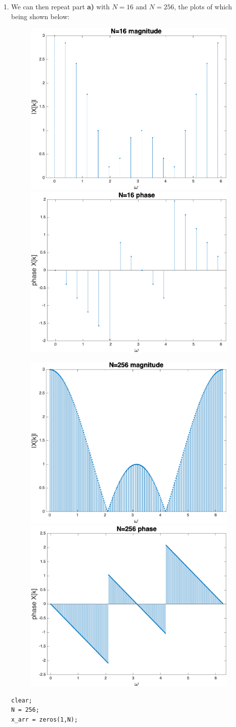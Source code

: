 \documentclass[12pt]{article}
\begin{document}
\begin{enumerate}[label=\textbf{\alph*)}, leftmargin=2.6em]
\item We can then repeat part \textbf{a)} with $N=16$ and $N=256$, the plots of which being shown below:
\begin{figure}[H]
    \centering
    \includegraphics[width=0.4\linewidth]{3.png}
    \includegraphics[width=0.4\linewidth]{4.png}
\end{figure}
\begin{figure} [H]
    \centering
    \includegraphics[width=0.4\linewidth]{5.png}
    \includegraphics[width=0.4\linewidth]{6.png}
\end{figure}

\begin{verbatim}
clear;
N = 256;
x_arr = zeros(1,N);


\end{verbatim}
\end{enumerate}
\end{document}
